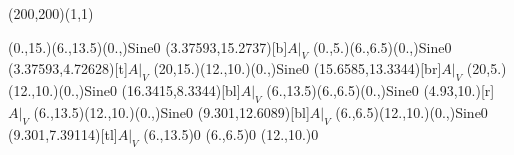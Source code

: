 \unitlength=1bp%

\begin{feynartspicture}(200,200)(1,1)

\FADiagram{}
\FAProp(0.,15.)(6.,13.5)(0.,){Sine}{0}
\FALabel(3.37593,15.2737)[b]{$A|_V$}
\FAProp(0.,5.)(6.,6.5)(0.,){Sine}{0}
\FALabel(3.37593,4.72628)[t]{$A|_V$}
\FAProp(20,15.)(12.,10.)(0.,){Sine}{0}
\FALabel(15.6585,13.3344)[br]{$A|_V$}
\FAProp(20,5.)(12.,10.)(0.,){Sine}{0}
\FALabel(16.3415,8.3344)[bl]{$A|_V$}
\FAProp(6.,13.5)(6.,6.5)(0.,){Sine}{0}
\FALabel(4.93,10.)[r]{$A|_V$}
\FAProp(6.,13.5)(12.,10.)(0.,){Sine}{0}
\FALabel(9.301,12.6089)[bl]{$A|_V$}
\FAProp(6.,6.5)(12.,10.)(0.,){Sine}{0}
\FALabel(9.301,7.39114)[tl]{$A|_V$}
\FAVert(6.,13.5){0}
\FAVert(6.,6.5){0}
\FAVert(12.,10.){0}
\end{feynartspicture}

